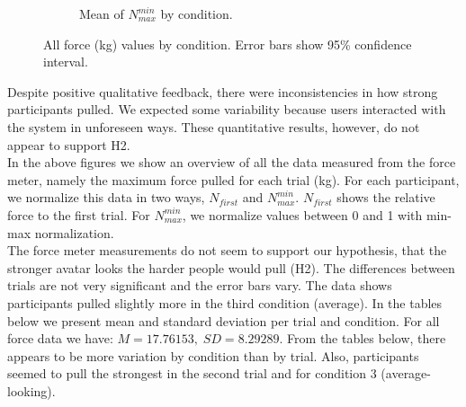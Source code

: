 \begin{figure}[H]
\begin{subfigure}[b]{0.4\textwidth}
         \caption{Mean of $N_{max}^{min}$ by condition.}
         \label{fig:meanN2Cond}
     \end{subfigure} 
      \caption{All force (kg) values by condition. Error bars show 95\%  confidence interval.}
         \label{fig:allForceCond}
\end{figure} 
 Despite positive qualitative feedback, there were inconsistencies in how strong participants pulled. We expected some variability because users interacted with the system in unforeseen ways. These quantitative results, however, do not appear to support H2.\\
In the above figures we show an overview of all the data measured from the force meter, namely the maximum force pulled for each trial (kg). For each participant, we normalize this data in two ways, $N_{first}$ and $N_{max}^{min}$. $N_{first}$ shows the relative force to the first trial. For $N_{max}^{min}$, we normalize values between 0 and 1 with min-max normalization.
\\
The force meter measurements do not seem to support our hypothesis, that the stronger avatar looks the harder people would pull (H2). The differences between trials are not very significant and the error bars vary. The data shows participants pulled slightly more in the third condition (average). In the tables below we present mean and standard deviation per trial and condition. For all force data we have: $M= 17.76153, \; SD=8.29289$.
From the tables below, there appears to be more variation by condition than by trial. Also, participants seemed to pull the strongest in the second trial and for condition 3 (average-looking).

